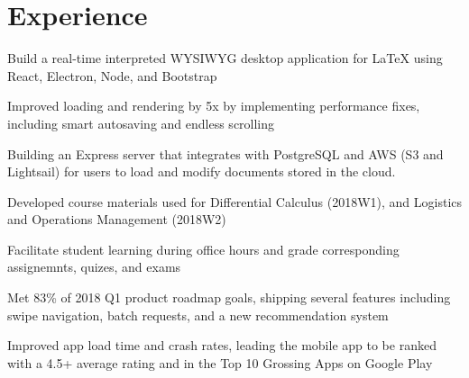 \documentclass[]{deedy-resume-openfont}
\begin{document}
\begin{minipage}[t]{0.66\textwidth}


\section{Experience}
\vspace{\topsep} %
\begin{tightemize}
\item Build a real-time interpreted WYSIWYG desktop application for LaTeX using React, Electron, Node, and Bootstrap
\item Improved loading and rendering by 5x by implementing performance fixes, including smart autosaving and endless scrolling
\item Building an Express server that integrates with PostgreSQL and AWS (S3 and Lightsail) for users to load and modify documents stored in the cloud.
\end{tightemize}
\sectionsep

\begin{tightemize}
\item Developed course materials used for Differential Calculus (2018W1), and Logistics and Operations Management (2018W2)
\item Facilitate student learning during office hours and grade corresponding assignemnts, quizes, and exams
\end{tightemize}
\sectionsep

\begin{tightemize}
\item Met 83\% of 2018 Q1 product roadmap goals, shipping several features including swipe navigation, batch requests, and a new recommendation system
\item Improved app load time and crash rates, leading the mobile app to be ranked with a 4.5+ average rating and in the Top 10 Grossing Apps on Google Play
\end{tightemize}
\sectionsep



\end{minipage}
\end{document}

